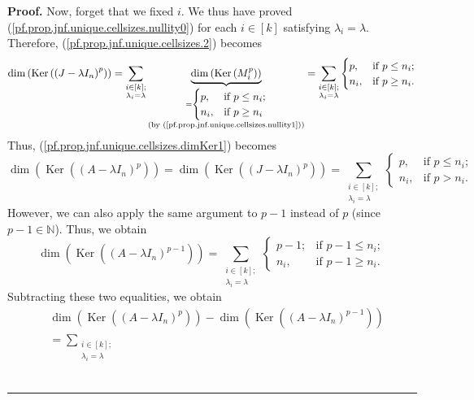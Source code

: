 \documentclass[numbers=enddot,12pt,final,onecolumn,notitlepage]{scrartcl}%
\numberwithin{exer}{subsection}
\theoremstyle{definition}
\newenvironment{proof}[1][Proof]{\noindent\textbf{#1.} }{\ \rule{0.5em}{0.5em}}
\let\sumnonlimits\sum
\renewcommand{\sum}{\sumnonlimits\limits}
\begin{document}
\begin{proof}
Now, forget that we fixed $i$. We thus have proved
(\ref{pf.prop.jnf.unique.cellsizes.nullity0}) for each $i\in\left[  k\right]
$ satisfying $\lambda_{i}=\lambda$. Therefore,
(\ref{pf.prop.jnf.unique.cellsizes.2}) becomes%
\[
\dim\left(  \operatorname*{Ker}\left(  \left(  J-\lambda I_{n}\right)
^{p}\right)  \right)  =\sum_{\substack{i\in\left[  k\right]  ;\\\lambda
_{i}=\lambda}}\underbrace{\dim\left(  \operatorname*{Ker}\left(  M_{i}%
^{p}\right)  \right)  }_{\substack{=%
\begin{cases}
p, & \text{if }p\leq n_{i};\\
n_{i}, & \text{if }p\geq n_{i}%
\end{cases}
\\\text{(by (\ref{pf.prop.jnf.unique.cellsizes.nullity1}))}}}=\sum
_{\substack{i\in\left[  k\right]  ;\\\lambda_{i}=\lambda}}%
\begin{cases}
p, & \text{if }p\leq n_{i};\\
n_{i}, & \text{if }p\geq n_{i}.
\end{cases}
\]
Thus, (\ref{pf.prop.jnf.unique.cellsizes.dimKer1}) becomes%
\[
\dim\left(  \operatorname*{Ker}\left(  \left(  A-\lambda I_{n}\right)
^{p}\right)  \right)  =\dim\left(  \operatorname*{Ker}\left(  \left(
J-\lambda I_{n}\right)  ^{p}\right)  \right)  =\sum_{\substack{i\in\left[
k\right]  ;\\\lambda_{i}=\lambda}}%
\begin{cases}
p, & \text{if }p\leq n_{i};\\
n_{i}, & \text{if }p>n_{i}.
\end{cases}
\]
However, we can also apply the same argument to $p-1$ instead of $p$ (since
$p-1\in\mathbb{N}$). Thus, we obtain%
\[
\dim\left(  \operatorname*{Ker}\left(  \left(  A-\lambda I_{n}\right)
^{p-1}\right)  \right)  =\sum_{\substack{i\in\left[  k\right]  ;\\\lambda
_{i}=\lambda}}%
\begin{cases}
p-1; & \text{if }p-1\leq n_{i};\\
n_{i}, & \text{if }p-1\geq n_{i}.
\end{cases}
\]
Subtracting these two equalities, we obtain%
\begin{align*}
&  \dim\left(  \operatorname*{Ker}\left(  \left(  A-\lambda I_{n}\right)
^{p}\right)  \right)  -\dim\left(  \operatorname*{Ker}\left(  \left(
A-\lambda I_{n}\right)  ^{p-1}\right)  \right) \\
&  =\sum_{\substack{i\in\left[  k\right]  ;\\\lambda_{i}=\lambda}}%

\end{align*}
\end{proof}
\end{document}
